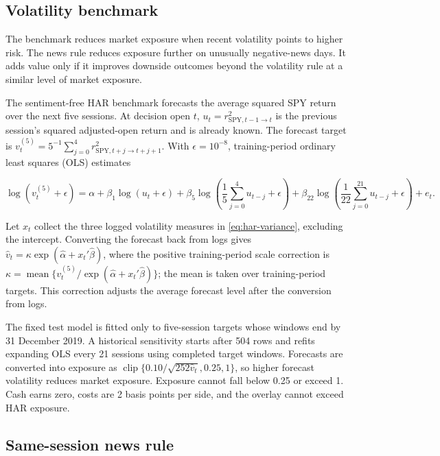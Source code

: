 \subsection{Volatility benchmark}

The benchmark reduces market exposure when recent volatility points to higher
risk. The news rule reduces exposure further on unusually negative-news days.
It adds value only if it improves downside outcomes beyond the volatility rule
at a similar level of market exposure.

The sentiment-free HAR benchmark forecasts the average squared SPY return over
the next five sessions. At decision open $t$,
$u_t=r^2_{\mathrm{SPY},t-1\rightarrow t}$ is the previous session's squared
adjusted-open return and is already known. The forecast target is
$v_t^{(5)}=5^{-1}\sum_{j=0}^{4}r^2_{\mathrm{SPY},t+j\rightarrow t+j+1}$. With
$\epsilon=10^{-8}$, training-period ordinary least squares (OLS) estimates

\begin{equation}
 \log(v_t^{(5)}+\epsilon)=\alpha+\beta_1\log(u_t+\epsilon)
 +\beta_5\log\left(\frac{1}{5}\sum_{j=0}^{4}u_{t-j}+\epsilon\right)
 +\beta_{22}\log\left(\frac{1}{22}\sum_{j=0}^{21}u_{t-j}+\epsilon\right)+e_t.
 \label{eq:har-variance}
\end{equation}

Let $x_t$ collect the three logged volatility measures in
\cref{eq:har-variance}, excluding the intercept. Converting the forecast back
from logs gives
$\widehat v_t=\kappa\exp(\widehat\alpha+x_t'\widehat\beta)$, where the positive
training-period scale correction is
$\kappa=\operatorname{mean}\{v_t^{(5)}/\exp(\widehat\alpha+x_t'\widehat\beta)\}$;
the mean is taken over training-period targets. This correction adjusts the
average forecast level after the conversion from logs.

The fixed test model is fitted only to five-session targets whose windows end by
31 December 2019. A historical sensitivity starts after 504 rows and refits
expanding OLS every 21 sessions using completed target windows. Forecasts are
converted into exposure as
$\operatorname{clip}\{0.10/\sqrt{252\widehat v_t},0.25,1\}$, so higher forecast
volatility reduces market exposure. Exposure cannot fall below 0.25 or exceed
1. Cash earns zero, costs are 2 basis points per side, and the overlay cannot
exceed HAR exposure.

\subsection{Same-session news rule}


